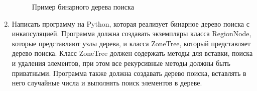 \begin{enumerate}
\begin{figure}[h]
\centering
{}
\caption{Пример бинарного дерева поиска}
\end{figure}

\item Написать программу на Python, которая реализует бинарное дерево поиска с инкапсуляцией. Программа должна создавать экземпляры класса RegionNode, которые представляют узлы дерева, и класса ZoneTree, который представляет дерево поиска. Класс ZoneTree должен содержать методы для вставки, поиска и удаления элементов, при этом все рекурсивные методы должны быть приватными. Программа также должна создавать дерево поиска, вставлять в него случайные числа и выполнять поиск элементов в дереве.


\end{enumerate}
